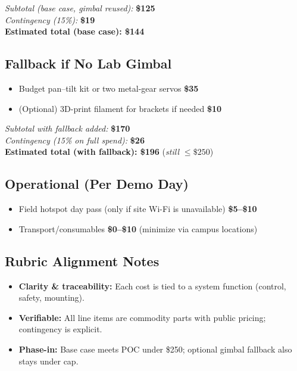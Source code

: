 \documentclass[12pt]{article}
\begin{document}
\noindent\textit{Subtotal (base case, gimbal reused):} \textbf{\$125} \\
\textit{Contingency (15\%):} \textbf{\$19} \\
\textbf{Estimated total (base case): \$144}

\subsection*{Fallback if No Lab Gimbal}
\begin{itemize}
  \item Budget pan–tilt kit or two metal-gear servos \dotfill \textbf{\$35}
  \item (Optional) 3D-print filament for brackets if needed \dotfill \textbf{\$10}
\end{itemize}

\noindent\textit{Subtotal with fallback added:} \textbf{\$170} \\
\textit{Contingency (15\% on full spend):} \textbf{\$26} \\
\textbf{Estimated total (with fallback): \$196} \quad(\textit{still $\leq\$250$})

\subsection*{Operational (Per Demo Day)}
\begin{itemize}
  \item Field hotspot day pass (only if site Wi-Fi is unavailable) \dotfill \textbf{\$5--\$10}
  \item Transport/consumables \dotfill \textbf{\$0--\$10} (minimize via campus locations)
\end{itemize}

\subsection*{Rubric Alignment Notes}
\begin{itemize}
  \item \textbf{Clarity \& traceability:} Each cost is tied to a system function (control, safety, mounting).
  \item \textbf{Verifiable:} All line items are commodity parts with public pricing; contingency is explicit.
  \item \textbf{Phase-in:} Base case meets POC under \$250; optional gimbal fallback also stays under cap.
\end{itemize}
\end{document}
